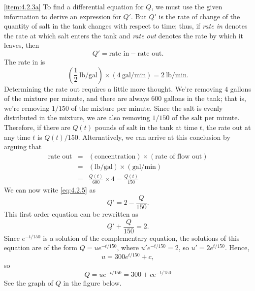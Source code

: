 \documentclass{ximera}
\begin{document}
\begin{example}
\begin{explanation} \ref{item:4.2.3a} To find a differential equation for $Q$, we must use
the given information to derive an expression for $Q'$. But $Q'$
is the rate of change of the quantity of salt in the tank changes with
respect to time;
  thus, if \textit{rate in} denotes the rate at which
salt enters
the tank and \textit{rate out} denotes the rate by which it
leaves, then
\begin{equation} \label{eq:4.2.5}
Q' = \mbox{rate in}-\mbox{rate out}.
\end{equation}
The rate in is
$$
\left(\frac{1}{2}\  \mbox{lb/gal}\right) \times (4\  \mbox{gal/min}) = 2\
\mbox{lb/min}.
$$
Determining the rate out requires a little more thought. We're
removing $4$ gallons of the mixture per minute, and there are always $600$
gallons in the tank; that is, we're removing $1/150$ of the mixture
per minute. Since the salt is evenly distributed in the mixture, we
are also removing $1/150$ of the salt per minute. Therefore, if there
are $Q(t)$ pounds of salt in the tank at time $t$, the rate out
at any time $t$ is $Q(t)/150$. Alternatively, we can arrive at this
conclusion by arguing that
$$
\begin{array}{lcl}
\mbox{rate out} & = & (\mbox{concentration})\times(\mbox{rate of
flow out})\\ \mbox{}&=&(\mbox{lb/gal})\times(\mbox{gal/min})\\
&=&\frac{Q(t)}{600}\times
4=\frac{Q(t)}{150}
\end{array}
$$
 We can now
write \eqref{eq:4.2.5} as
$$
Q' = 2-\frac{Q}{150}.
$$
This first order equation can be rewritten as
$$
Q'+\frac{Q}{150} = 2.
$$
Since $e^{-t/150}$ is a solution of the complementary equation, the
solutions of this equation are of the form  $Q=ue^{-t/150}$, where
$u'e^{-t/150}=2$, so $u'=2e^{t/150}$. Hence,
$$
u = 300e^{t/150}+c,
$$
 so
\begin{equation} \label{eq:4.2.6}
Q=ue^{-t/150}=300+ce^{-t/150}
\end{equation}
See the graph of $Q$ in the figure below.


\begin{center}
\end{center}


\end{explanation}
\end{example}
\end{document}
